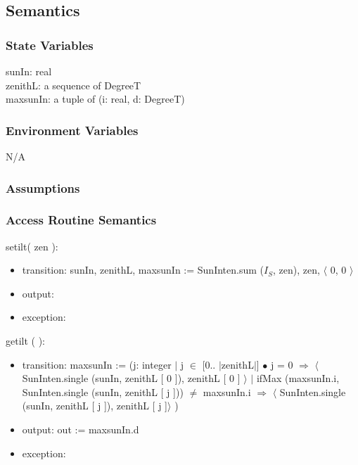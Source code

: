 \documentclass[12pt, titlepage]{article}
\begin{document}
\subsection{Semantics}

\subsubsection{State Variables}

sunIn: real\\
zenithL: a sequence of DegreeT\\
maxsunIn: a tuple of (i: real, d: DegreeT)\\


\subsubsection{Environment Variables}

N/A

\subsubsection{Assumptions}



\subsubsection{Access Routine Semantics}

\noindent {} setilt( zen ):
\begin{itemize}
\item transition: sunIn, zenithL, maxsunIn := SunInten.sum ($I_{S}$, zen),   zen, $\langle$ 0, 0 $\rangle$
\item output: 
\item exception: 
\end{itemize}


\noindent {} getilt ( ):
\begin{itemize}
\item transition: maxsunIn := (j: integer $|$ j $\in$ [0.. $|$zenithL$|$] $\bullet$ j = 0 $\Rightarrow$  $\langle$ SunInten.single (sunIn, zenithL [ 0 ]), zenithL [ 0 ] $\rangle$ $|$ ifMax (maxsunIn.i, SunInten.single (sunIn, zenithL [ j ])) $\neq$ maxsunIn.i $\Rightarrow$  $\langle$ SunInten.single (sunIn, zenithL [ j ]), zenithL [ j ]$\rangle$ )
 
\item output: out := maxsunIn.d
\item exception: 
\end{itemize}
\end{document}
